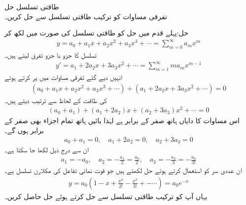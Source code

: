 \quad طاقتی تسلسل حل \\
تفرقی مساوات  کو ترکیب طاقتی تسلسل سے حل کریں۔

حل:پہلے قدم میں حل کو طاقتی تسلسل کی صورت میں لکھ کر
\begin{align}\label{مساوات_بیسل_طاقتی_تسلسل_حل_الف}
y=a_0+a_1x+a_2x^2+a_3x^3+\cdots=\sum_{m=0}^{\infty} a_m x^m
\end{align}
تسلسل کا جزو با جزو تفرق لیتے ہیں۔
\begin{align}\label{مساوات_بیسل_طاقتی_تسلسل_حل_ب}
y'=a_1+2a_2x+3a_3x^2+\cdots=\sum_{m=1}^{\infty} ma_mx^{m-1}
\end{align}
انہیں دیے گئے تفرقی مساوات میں پر کرتے ہوئے
\begin{align*}
(a_0+a_1x+a_2x^2+a_3x^3+\cdots)+(a_1+2a_2x+3a_3x^2+\cdots)=0
\end{align*}
 کی طاقت کے لحاظ سے ترتیب دیتے ہیں۔
\begin{align*}
(a_0+a_1)+(a_1+2a_2)x+(a_2+3a_3)x^2+\cdots=0
\end{align*}
اس مساوات کا دایاں ہاتھ صفر کے برابر ہے لہٰذا بائیں ہاتھ تمام اجزاء بھی صفر کے برابر ہوں گے۔
\begin{align*}
a_0+a_1=0,\quad a_1+2a_2=0, \quad a_2+3a_3=0
\end{align*}
ان سے درج ذیل لکھا جا سکتا ہے۔
\begin{align*}
a_1=-a_0,\quad a_2=-\frac{a_1}{2}=\frac{a_0}{2},\quad a_3=-\frac{a_2}{3}=-\frac{a_0}{3!}
\end{align*}
ان عددی سر کو استعمال کرتے ہوئے  حل  لکھتے ہیں جو قوت نمائی تفاعل  کی مکلارن تسلسل ہے۔
\begin{align*}
y=a_0(1-x+\frac{x^2}{2!}-\frac{x^3}{3!}+-\cdots)=a_0 e^{-x}
\end{align*}
یہاں آپ   کو ترکیب طاقتی تسلسل سے حل کرتے ہوئے حل  حاصل کریں۔

